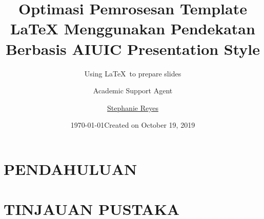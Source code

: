 \documentclass{uic-beamer}
\title{Optimasi Pemrosesan Template LaTeX Menggunakan Pendekatan Berbasis AI}
\author{Academic Support Agent}
\date{\today}
\begin{document}
\maketitle

\begin{abstract}

\end{abstract}

\chapter{PENDAHULUAN}


\chapter{TINJAUAN PUSTAKA}


\usepackage{amsfonts,amsmath,oldgerm}

\newcommand{\testcolor}[1]{\colorbox{#1}{\textcolor{#1}{test}} \texttt{#1}}

\newcommand{\hrefcol}[2]{\textcolor{cyan}{\href{#1}{#2}}}

\title{UIC Presentation Style}
\subtitle{Using \LaTeX\ to prepare slides}
\author{\href{mailto:stephanie@math.uic.edu}{Stephanie Reyes}}
\date{Created on October 19, 2019}
\titlebackground{}

\end{document}
